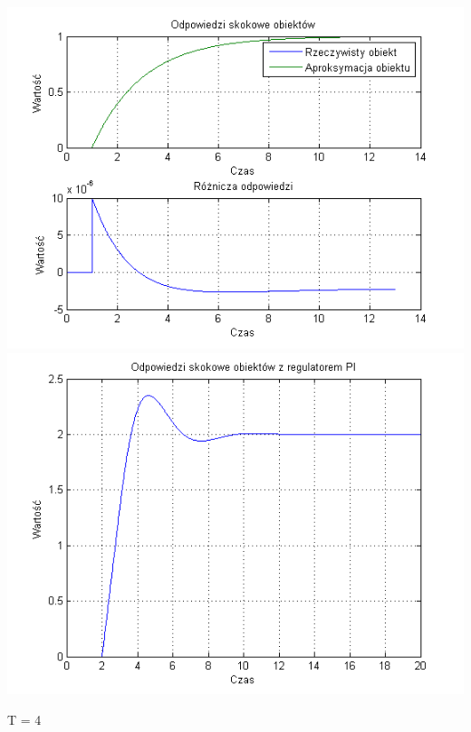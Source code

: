 \documentclass[10pt,a4paper]{article}
\begin{document}
\begin{center}
\includegraphics[scale=1]{images/jeden/skrypt_21.png}\\
\includegraphics[scale=1]{images/jeden/skrypt_22.png}\\
\end{center}
\newpage
T = 4
\end{document}
